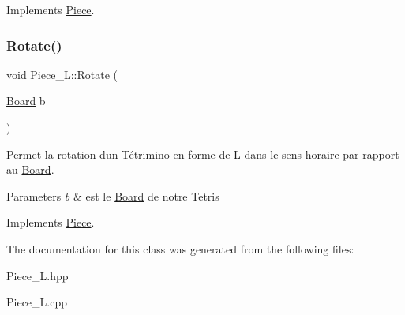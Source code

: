 Implements \hyperlink{classPiece_a56cdf7f4234fe848a3e203b693b7a862}{Piece}.

\mbox{\label{classPiece__L_aa865e9d2c6c468ac2921d6adb88f4d1b}} 
\subsubsection{\texorpdfstring{Rotate()}{Rotate()}}
{\footnotesize\ttfamily void Piece\+\_\+\+L\+::\+Rotate (\begin{DoxyParamCaption}\item[{\hyperlink{classBoard}{Board}}]{b }\end{DoxyParamCaption})\hspace{0.3cm}{\ttfamily [virtual]}}



Permet la rotation d\textquotesingle{}un Tétrimino en forme de L dans le sens horaire par rapport au \hyperlink{classBoard}{Board}. 


\begin{DoxyParams}{Parameters}
{\em b} & est le \hyperlink{classBoard}{Board} de notre Tetris \\
\hline
\end{DoxyParams}


Implements \hyperlink{classPiece_a078f3cc6281cb8f60af3ae2266c651ba}{Piece}.



The documentation for this class was generated from the following files\+:\begin{DoxyCompactItemize}
\item 
Piece\+\_\+\+L.\+hpp\item 
Piece\+\_\+\+L.\+cpp\end{DoxyCompactItemize}
